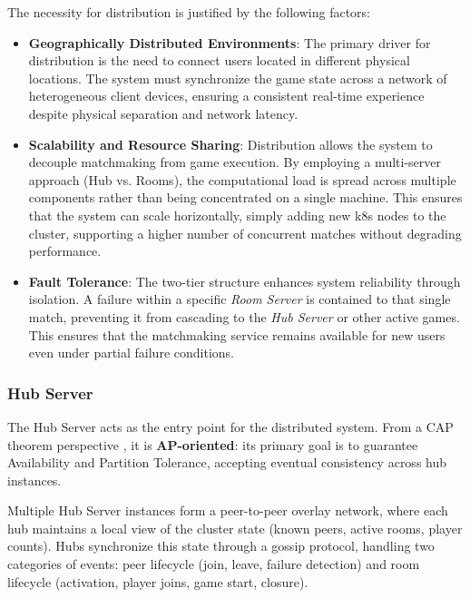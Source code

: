The necessity for distribution is justified by the following factors:
\begin{itemize}
    \item \textbf{Geographically Distributed Environments}: The primary driver for distribution is the need to connect users located in different physical locations.
    The system must synchronize the game state across a network of heterogeneous client devices, ensuring a consistent real-time experience despite physical separation and network latency.

    \item \textbf{Scalability and Resource Sharing}: Distribution allows the system to decouple matchmaking from game execution.
    By employing a multi-server approach (Hub vs. Rooms), the computational load is spread across multiple components rather than being concentrated on a single machine.
    This ensures that the system can scale horizontally, simply adding new k8s nodes to the cluster, supporting a higher number of concurrent matches without degrading performance.

    \item \textbf{Fault Tolerance}: The two-tier structure enhances system reliability through isolation.
    A failure within a specific \textit{Room Server} is contained to that single match, preventing it from cascading to the \textit{Hub Server} or other active games.
    This ensures that the matchmaking service remains available for new users even under partial failure conditions.
\end{itemize}

\subsubsection{Hub Server}

The Hub Server acts as the entry point for the distributed system.
From a CAP theorem perspective \cite{brewer2000cap, gilbert2002cap}, it is \textbf{AP-oriented}: its primary goal is to guarantee Availability and Partition Tolerance, accepting eventual consistency across hub instances.

Multiple Hub Server instances form a peer-to-peer overlay network, where each hub maintains a local view of the cluster state (known peers, active rooms, player counts).
Hubs synchronize this state through a gossip protocol, handling two categories of events: peer lifecycle (join, leave, failure detection) and room lifecycle (activation, player joins, game start, closure).

